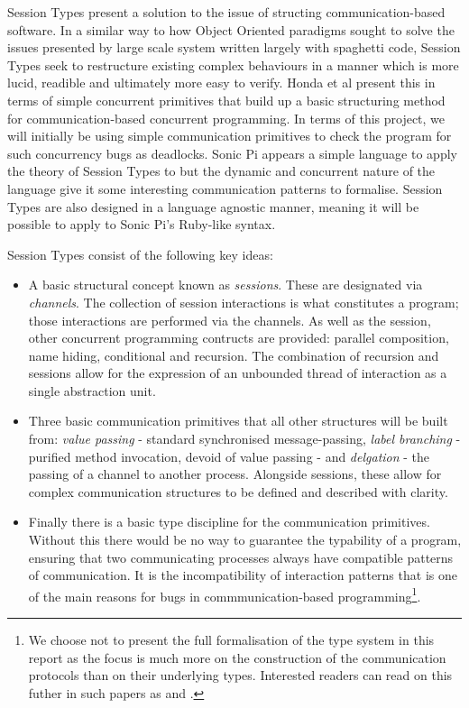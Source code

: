 \documentclass[11pt, abstracton, twoside, titlepage=true]{scrartcl}
\begin{document}
Session Types present a solution to the issue of structing communication-based 
software. In a similar way to how Object Oriented paradigms sought to solve 
the issues presented by large scale system written largely with spaghetti 
code, Session Types seek to restructure existing complex behaviours in a 
manner which is more lucid, readible and ultimately more easy to verify. Honda 
et al \cite{HVM98} present this in terms of simple concurrent primitives that 
build up a basic structuring method for communication-based concurrent 
programming. In terms of this project, we will initially be using simple 
communication primitives to check the program for such concurrency bugs as 
deadlocks. Sonic Pi appears a simple language to apply the theory of Session 
Types to but the dynamic and concurrent nature of the language give it some 
interesting communication patterns to formalise. Session Types 
are also designed in a language agnostic manner, meaning it will be possible to 
apply to Sonic Pi's Ruby-like syntax.

Session Types consist of the following key ideas:

\begin{itemize}
	\item A basic structural concept known as \emph{sessions}. These are designated 
	via \emph{channels}. The collection of session interactions is what constitutes a 
	program; those interactions are performed via the channels. As well as the 
	session, other concurrent programming contructs are provided: parallel 
	composition, name hiding, conditional and recursion. The combination of 
	recursion and sessions allow for the expression of an unbounded thread of 
	interaction as a single abstraction unit.

	\item Three basic communication primitives that all other structures will be 
	built from: \emph{value passing} - standard synchronised message-passing, 
	\emph{label branching} - purified method invocation, devoid of value passing - and 
	\emph{delgation} - the passing of a channel to another process. Alongside 
	sessions, these allow for complex communication structures to be defined and 
	described with clarity.

	\item Finally there is a basic type discipline for the communication primitives. 
	Without this there would be no way to guarantee the typability of a program, 
	ensuring that two communicating processes always have compatible patterns of 
	communication. It is the incompatibility of interaction patterns that is one 
	of the main reasons for bugs in commmunication-based programming\footnote{We choose not to present the full formalisation of the type system 
	in this report as the focus is much more on the construction of the 
	communication protocols than on their underlying types. Interested readers
	can read on this futher in such papers as \cite{HVM98} and \cite{HYC08}.}.
\end{itemize}
\end{document}
